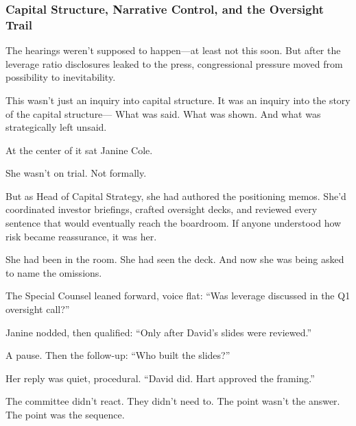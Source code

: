 \medskip

\subsubsection{Capital Structure, Narrative Control, and the Oversight Trail}

The hearings weren’t supposed to happen—at least not this soon.
But after the leverage ratio disclosures leaked to the press, 
congressional pressure moved from possibility to inevitability.

This wasn’t just an inquiry into capital structure.
It was an inquiry into the story of the capital structure—
What was said. What was shown. And what was strategically left unsaid.

At the center of it sat Janine Cole.

She wasn’t on trial. Not formally.

But as Head of Capital Strategy, she had authored the positioning memos.
She’d coordinated investor briefings, crafted oversight decks, and reviewed every sentence that 
would eventually reach the boardroom.
If anyone understood how risk became reassurance, it was her.

She had been in the room.
She had seen the deck.
And now she was being asked to name the omissions.

The Special Counsel leaned forward, voice flat:
“Was leverage discussed in the Q1 oversight call?”

Janine nodded, then qualified:
“Only after David’s slides were reviewed.”

A pause. Then the follow-up:
“Who built the slides?”

Her reply was quiet, procedural.
“David did. Hart approved the framing.”

The committee didn’t react. They didn’t need to.
The point wasn’t the answer.
The point was the sequence.

\medskip

